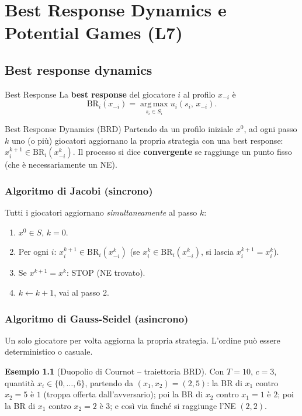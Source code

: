 \documentclass[12pt,a4paper,twoside]{book}
\theoremstyle{plain}
\theoremstyle{definition}
\newtheorem{example}[theorem]{Esempio}
\newcommand{\BR}{\mathrm{BR}}
\newcommand{\argmax}{\operatorname*{arg\,max}}
\begin{document}
\chapter{Best Response Dynamics e Potential Games (L7)}

\section{Best response dynamics}

\begin{defbox}{Best Response}
La \textbf{best response} del giocatore $i$ al profilo $x_{-i}$ è
\[
  \BR_i(x_{-i}) = \argmax_{s_i\in S_i} u_i(s_i,\, x_{-i}).
\]
\end{defbox}

\begin{defbox}{Best Response Dynamics (BRD)}
Partendo da un profilo iniziale $x^0$, ad ogni passo $k$ uno (o più) giocatori aggiornano la propria strategia con una best response: $x^{k+1}_i\in\BR_i(x^k_{-i})$. Il processo si dice \textbf{convergente} se raggiunge un punto fisso (che è necessariamente un NE).
\end{defbox}

\subsection{Algoritmo di Jacobi (sincrono)}
Tutti i giocatori aggiornano \emph{simultaneamente} al passo $k$:
\begin{enumerate}
  \item $x^0\in S$, $k=0$.
  \item Per ogni $i$: $x_i^{k+1}\in\BR_i(x^k_{-i})$ (se $x_i^k\in\BR_i(x^k_{-i})$, si lascia $x_i^{k+1}=x_i^k$).
  \item Se $x^{k+1}=x^k$: STOP (NE trovato).
  \item $k\leftarrow k+1$, vai al passo 2.
\end{enumerate}

\subsection{Algoritmo di Gauss-Seidel (asincrono)}
Un solo giocatore per volta aggiorna la propria strategia. L'ordine può essere deterministico o casuale.

\begin{example}[Duopolio di Cournot -- traiettoria BRD]
Con $T=10$, $c=3$, quantità $x_i\in\{0,\dots,6\}$, partendo da $(x_1,x_2)=(2,5)$: la BR di $x_1$ contro $x_2=5$ è $1$ (troppa offerta dall'avversario); poi la BR di $x_2$ contro $x_1=1$ è $2$; poi la BR di $x_1$ contro $x_2=2$ è $3$; e così via finché si raggiunge l'NE $(2,2)$.
\end{example}
\end{document}
